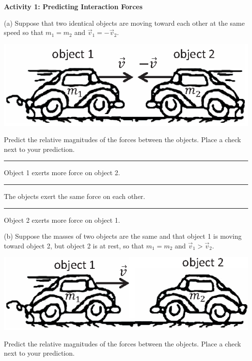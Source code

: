 \textbf{Activity 1: Predicting Interaction Forces} 

(a) Suppose that two identical objects are
moving toward each other at the same speed so that
$m_{1}=m_{2}$ and 
${\vec  v}_1=-{\vec  v}_2$.

{\par\centering \includegraphics{newtons_laws/newtons_laws_fig1_new.eps} \par}

\pagebreak[2]

\leftskip=1cm

Predict the relative magnitudes of the forces between the objects.
Place a check next to your prediction.

\rule{0.5in}{0.1pt} Object 1 exerts more force on object 2. 

\rule{0.5in}{0.1pt} The objects exert the same force on each other. 

\rule{0.5in}{0.1pt} Object 2 exerts more force on object 1.

\leftskip=0cm

\bigskip

\pagebreak[3]
(b) Suppose the masses of two objects are the same and that object 1 is moving
toward object 2, but object 2 is at rest, so that
$m_{1}=m_{2}$ and
${\vec  v}_1 > {\vec  v}_2$.

{\par\centering \includegraphics{newtons_laws/newtons_laws_fig2_new.eps} \par}

\leftskip=1cm

Predict the relative magnitudes of the forces between the objects.
Place a check next to your prediction.

